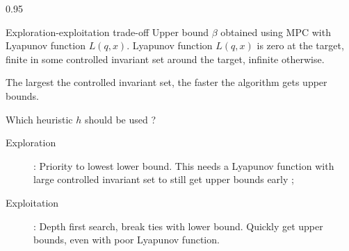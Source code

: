 \documentclass[final]{beamer}
\newlength{\onecolwid}
\begin{document}
\begin{frame}[t,fragile]
\begin{columns}[t]
\begin{column}{0.95\onecolwid}
  \begin{block}{Exploration-exploitation trade-off}
    Upper bound $\beta$ obtained using \alert{MPC} with \alert{Lyapunov} function $L(q, x)$.
    Lyapunov function $L(q, x)$ is zero at the target, finite in some controlled invariant set around the target,
    infinite otherwise.

    The \alert{largest} the controlled invariant set, the \alert{faster} the algorithm gets upper bounds.

    Which \alert{heuristic} $h$ should be used ?
    \begin{description}
      \item[Exploration]:
        Priority to lowest lower bound.
        This needs a Lyapunov function with large controlled invariant set to still get upper bounds early ;
      \item[Exploitation]:
        Depth first search, break ties with lower bound.
        Quickly get upper bounds, even with poor Lyapunov function.
    \end{description}
  \end{block}

\end{column}



\end{columns}
\end{frame}
\end{document}
